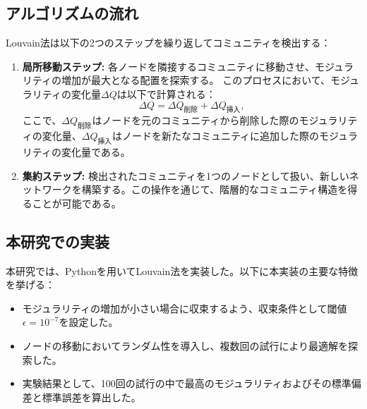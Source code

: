 \subsection{アルゴリズムの流れ}
Louvain法は以下の2つのステップを繰り返してコミュニティを検出する：
\begin{enumerate}
    \item \textbf{局所移動ステップ:} 各ノードを隣接するコミュニティに移動させ、モジュラリティの増加が最大となる配置を探索する。
    このプロセスにおいて、モジュラリティの変化量$\Delta Q$は以下で計算される：
    \begin{equation}
    \Delta Q = \Delta Q_{\text{削除}} + \Delta Q_{\text{挿入}},
    \end{equation}
    ここで、$\Delta Q_{\text{削除}}$はノードを元のコミュニティから削除した際のモジュラリティの変化量、$\Delta Q_{\text{挿入}}$はノードを新たなコミュニティに追加した際のモジュラリティの変化量である。
    \item \textbf{集約ステップ:} 検出されたコミュニティを1つのノードとして扱い、新しいネットワークを構築する。この操作を通じて、階層的なコミュニティ構造を得ることが可能である。
\end{enumerate}

\subsection{本研究での実装}
本研究では、Pythonを用いてLouvain法を実装した。以下に本実装の主要な特徴を挙げる：
\begin{itemize}
    \item モジュラリティの増加が小さい場合に収束するよう、収束条件として閾値$\epsilon = 10^{-7}$を設定した。
    \item ノードの移動においてランダム性を導入し、複数回の試行により最適解を探索した。
    \item 実験結果として、100回の試行の中で最高のモジュラリティおよびその標準偏差と標準誤差を算出した。
\end{itemize}